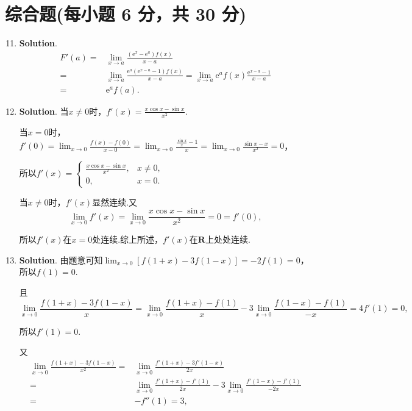 \documentclass[../Main.tex]{subfiles}
\begin{document}
\section{综合题(每小题 6 分，共 30 分)}
\begin{enumerate}
    \setcounter{enumi}{10}
    \item \textbf{Solution}.
          \[
              \begin{aligned}
                  F'(a)= & \lim_{x\to a}\frac{(\mathrm{e}^x-\mathrm{e}^a)f(x)}{x-a}                                                                     \\
                  =      & \lim_{x\to a}\frac{\mathrm{e}^a(\mathrm{e}^{x-a}-1)f(x)}{x-a}=\lim_{x\to a}\mathrm{e}^{a} f(x)\frac{\mathrm{e}^{x-a}-1}{x-a} \\
                  =      & \mathrm{e}^{a} f(a).
              \end{aligned}
          \]

    \item \textbf{Solution}. 当$x\neq0$时，$f'(x)=\frac{x\cos x-\sin x}{x^{2}}$.

          当$x=0$时，$f'(0)=\lim_{x\to0}\frac{f(x)-f(0)}{x-0}=\lim_{x\to0}\frac{\frac{\sin
                      x}{x}-1}{x}=\lim_{x\to0}\frac{\sin x-x}{x^{2}}=0$，

          所以$f'(x)=
              \begin{cases}
                  \frac{x\cos x-\sin x}{x^2}, & x\neq0, \\
                  0,                          & x=0.
              \end{cases}$

          当$x\neq0$时，$f'(x)$显然连续.又
          \[
              \lim_{x\to0}f'(x)=\lim_{x\to0}\frac{x\cos x-\sin x}{x^{2}}=0=f'(0),
          \]

          所以$f'(x)$在$x=0$处连续.综上所述，$f'(x)$在$\mathbf{R}$上处处连续.

    \item \textbf{Solution}. 由题意可知$\lim_{x\to0}\left[f(1+x)-3f(1-x)\right
              ]=-2f(1)=0$，所以$f(1)=0$.

          且
          \[
              \lim_{x\to0}\frac{f(1+x)-3f(1-x)}{x}=\lim_{x\to0}\frac{f(1+x)-f(1)}{x}-3\lim
              _{x\to0}\frac{f(1-x)-f(1)}{-x}=4f'(1)=0,
          \]

          所以$f'(1)=0$.

          又
          \[
              \begin{aligned}
                  \lim_{x\to0}\frac{f(1+x)-3f(1-x)}{x^2}= & \lim_{x\to0}\frac{f'(1+x)-3f'(1-x)}{2x}                                     \\
                  =                                       & \lim_{x\to0}\frac{f'(1+x)-f'(1)}{2x}-3\lim_{x\to0}\frac{f'(1-x)-f'(1)}{-2x} \\
                  =                                       & -f''(1)=3,
              \end{aligned}
          \]


\end{enumerate}
\end{document}
